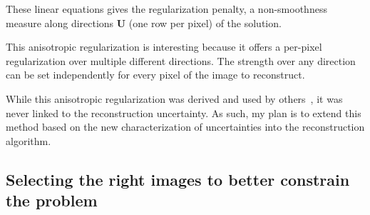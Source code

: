 These linear equations gives the regularization penalty, a non-smoothness measure along directions $\mathbf{U}$ (one row per pixel) of the solution.

This anisotropic regularization is interesting because it offers a per-pixel regularization over multiple different directions. The strength over any direction can be set independently for every pixel of the image to reconstruct.

While this anisotropic regularization was derived and used by others~\cite{hernandez-pami-11}, it was never linked to the reconstruction uncertainty. As such, my plan is to extend this method based on the new characterization of uncertainties into the reconstruction algorithm.


\subsection{Selecting the right images to better constrain the problem}
\label{subsec:selection}


